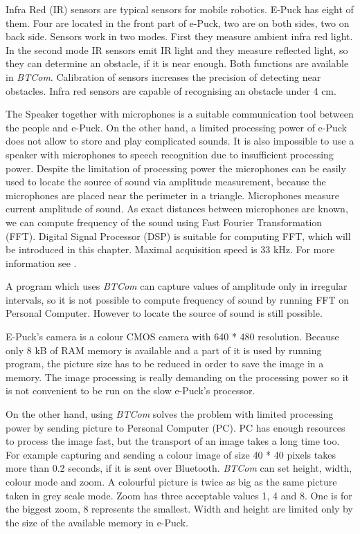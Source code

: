 \documentclass[12pt,notitlepage]{report}
\begin{document}
	Infra Red (IR) sensors are typical sensors for mobile robotics. E-Puck has eight of them.
	Four are located in the front part of e-Puck, two are on both sides, two on back side.
	Sensors work in two modes. First they measure ambient infra red light.
	In the second mode IR sensors emit IR light and they measure reflected light, so 
	they can determine an obstacle, if it is near enough.
	Both functions are available in {\it BTCom}. 				
	Calibration of sensors increases the precision of detecting near obstacles.
	Infra red sensors are capable of recognising an obstacle under 4 cm.
	
	The Speaker together with microphones is a suitable communication tool between the people and e-Puck.
	On the other hand, a limited processing power of e-Puck does not allow to store and
	 play complicated sounds. It is also impossible to use a speaker with microphones to speech
	 recognition due to insufficient processing power.
	Despite the limitation of processing power the microphones can be easily used to locate
	the source of sound via amplitude measurement, because the microphones are placed near the perimeter
	in a triangle. Microphones measure current amplitude of sound. As exact distances between microphones 
	are known, we can compute frequency of the sound using Fast Fourier Transformation (FFT).
	Digital Signal Processor (DSP) is suitable for computing FFT,
	 which will be introduced in this chapter.
	Maximal acquisition speed is 33 kHz. 
	For more information see \cite{sound}.
	
	A program which uses {\it BTCom} can capture values of amplitude only in irregular intervals, so 
	it is not possible to compute frequency of sound by running FFT on Personal Computer. 
	However to locate the source of sound is still possible.
	
	
	E-Puck's camera is a colour CMOS camera with 640 * 480 resolution. 
	Because only 8 kB of RAM memory is available and a part of it is used by running program,
	the picture size has to be reduced in order to save the image in a memory.
	The image processing is really demanding on the processing power so it is not 
	convenient to be run on the slow e-Puck's processor.
	
	On the other hand, using {\it BTCom} solves the problem with limited processing power
	by sending picture to Personal Computer (PC). PC has enough resources to process the image fast,
	 but the transport of an image takes a long time too. 
	 For example capturing and sending a colour image of size 40 * 40 pixels 
	takes more than 0.2 seconds, if it is sent over Bluetooth.
	{\it BTCom} can set height, width, colour mode and zoom. A colourful picture is twice as big as the same picture taken
	in grey scale mode.
	 Zoom has three acceptable values 1, 4 and 8. One is for the biggest zoom, 8 represents the smallest.
	Width and height are limited only by the size of the available memory in e-Puck.
	
\end{document}
